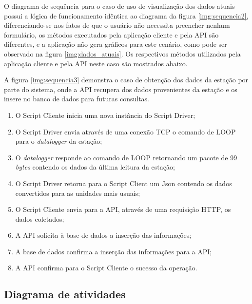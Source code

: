 O diagrama de sequência para o caso de uso de visualização dos dados atuais possui a lógica de funcionamento idêntica ao diagrama da figura \ref{img:sequencia2}, diferenciando-se nos fatos de que o usuário não necessita preencher nenhum formulário, os métodos executados pela aplicação cliente e pela API são diferentes, e a aplicação não gera gráficos para este cenário, como pode ser observado na figura \ref{img:dados_atuais}. Os respectivos métodos utilizados pela aplicação cliente e pela API neste caso são mostrados abaixo.



A figura \ref{img:sequencia3} demonstra o caso de obtenção dos dados da estação por parte do sistema, onde a API recupera dos dados provenientes da estação e os insere no banco de dados para futuras consultas.



\begin{enumerate}
	\item O Script Cliente inicia uma nova instância do Script Driver;
	\item O Script Driver envia através de uma conexão TCP o comando de LOOP para o \textit{datalogger} da estação;
	\item O \textit{datalogger} responde ao comando de LOOP retornando um pacote de 99 \textit{bytes} contendo os dados da última leitura da estação;
	\item O Script Driver retorna para o Script Client um Json contendo os dados convertidos para as unidades mais usuais;
	\item O Script Cliente envia para a API, através de uma requisição HTTP, os dados coletados;
	\item A API solicita à base de dados a inserção das informações;
	\item A base de dados confirma a inserção das informações para a API;
	\item A API confirma para o Script Cliente o sucesso da operação.
\end{enumerate}

\subsection{Diagrama de atividades} \label{subsec:diagAtiv}

